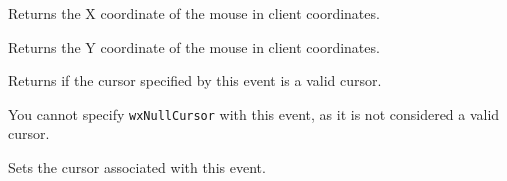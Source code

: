 \label{wxsetcursoreventgetx}


Returns the X coordinate of the mouse in client coordinates.


\label{wxsetcursoreventgety}


Returns the Y coordinate of the mouse in client coordinates.


\label{wxsetcursoreventhascursor}


Returns \true if the cursor specified by this event is a valid cursor.


You cannot specify \texttt{wxNullCursor} with this event, as it is not
considered a valid cursor.


\label{wxsetcursoreventsetcursor}


Sets the cursor associated with this event.


